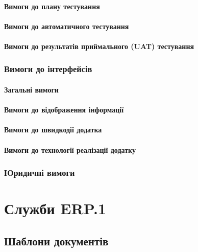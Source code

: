 \subsubsection{Вимоги до плану тестування}

\subsubsection{Вимоги до автоматичного тестування}

\subsubsection{Вимоги до результатів приймального (UAT) тестування}

\subsection{Вимоги до інтерфейсів}

\subsubsection{Загальні вимоги}

\subsubsection{Вимоги до відображення інформації}

\subsubsection{Вимоги до швидкодії додатка}

\subsubsection{Вимоги до технології реалізації додатку}

\subsection{Юридичні вимоги}

\newpage
\chapter{Служби ERP.1}
\section{Шаблони документів}

